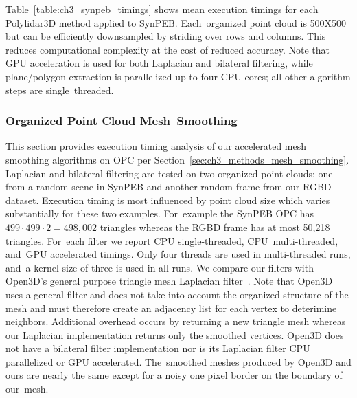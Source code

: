 Table~\ref{table:ch3_synpeb_timings} shows mean execution timings for each Polylidar3D method applied to SynPEB.  Each~organized point cloud is 500X500 but can be efficiently downsampled by striding over rows and columns. This reduces computational complexity at the cost of reduced accuracy. Note that GPU acceleration is used for both Laplacian and bilateral filtering, while plane/polygon extraction is parallelized up to four CPU cores; all other algorithm steps are single~threaded. 

\begin{table}[H]
\centering
\caption{Mean execution timings (ms) and accuracy of Polylidar3D on~SynPEB}
\label{table:ch3_synpeb_timings}
\end{table}
\unskip


\subsubsection{Organized Point Cloud Mesh~Smoothing}

This section provides execution timing analysis of our accelerated mesh smoothing algorithms on \ac{OPC} per Section~\ref{sec:ch3_methods_mesh_smoothing}. Laplacian and bilateral filtering are tested on two organized point clouds; one from a random scene in SynPEB and another random frame from our \ac{RGBD} dataset.  Execution timing is most influenced by point cloud size which varies substantially for these two examples. For~example the SynPEB \ac{OPC} has $499 \cdot 499 \cdot 2 = 498,002$ triangles whereas the \ac{RGBD} frame has at most 50,218 triangles. For~each filter we report CPU single-threaded, CPU~multi-threaded, and~GPU accelerated timings. Only four threads are used in multi-threaded runs, and~a kernel size of three is used in all runs. We compare our filters with Open3D's general purpose triangle mesh Laplacian filter~\cite{zhou_open3d_2018}. Note that Open3D uses a general filter and does not take into account the organized structure of the mesh and must therefore create an adjacency list for each vertex to deterimine neighbors. Additional overhead occurs by returning a new triangle mesh whereas our Laplacian implementation returns only the smoothed vertices. Open3D does not have a bilateral filter implementation nor is its Laplacian filter CPU parallelized or GPU accelerated. The~smoothed meshes produced by Open3D and ours are nearly the same except for a noisy one pixel border on the boundary of our~mesh.  

